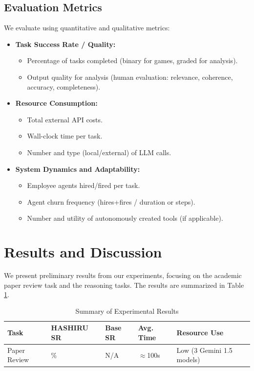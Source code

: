 \documentclass[conference]{IEEEtran}
\begin{document}
\subsection{Evaluation Metrics}
\label{subsec:metrics}
We evaluate using quantitative and qualitative metrics:
\begin{itemize}
    \item \textbf{Task Success Rate / Quality:}
        \begin{itemize}
            \item Percentage of tasks completed (binary for games, graded for analysis).
            \item Output quality for analysis (human evaluation: relevance, coherence, accuracy, completeness).
        \end{itemize}
    \item \textbf{Resource Consumption:}
        \begin{itemize}
            \item Total external API costs.
            \item Wall-clock time per task.
            \item Number and type (local/external) of LLM calls.
        \end{itemize}
    \item \textbf{System Dynamics and Adaptability:}
        \begin{itemize}
            \item Employee agents hired/fired per task.
            \item Agent churn frequency (hires+fires / duration or steps).
            \item Number and utility of autonomously created tools (if applicable).
        \end{itemize}
\end{itemize}

\section{Results and Discussion}
\label{sec:results}
We present preliminary results from our experiments, focusing on the academic paper review task and the reasoning tasks. The results are summarized in Table \ref{tab:results}.

\begin{table}[h]
    \centering
    \caption{Summary of Experimental Results}
    \label{tab:results}
    \begin{tabular}{|>{\centering\arraybackslash}p{1cm}|
                    >{\centering\arraybackslash}p{1.2cm}|
                    >{\centering\arraybackslash}p{1cm}|
                    >{\centering\arraybackslash}p{1cm}|
                    >{\centering\arraybackslash}p{2cm}|}
        \hline
        \textbf{Task} & \textbf{HASHIRU SR} & \textbf{Base SR} & \textbf{Avg. Time} & \textbf{Resource Use} \\
        \hline
        Paper Review & 58\% & N/A & $\approx$100s & Low (3 Gemini 1.5 models) \\
        \hline
    \end{tabular}
\end{table}
\end{document}
